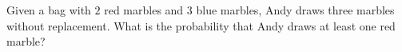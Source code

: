 Given a bag with $2$ red marbles and $3$ blue marbles, Andy draws three marbles without replacement. What is the probability that Andy draws at least one red marble?
